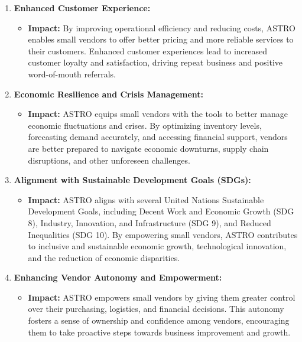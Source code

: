 \begin{enumerate}
	\item \textbf{Enhanced Customer Experience:}
	      \begin{itemize}
		      \item \textbf{Impact:} By improving operational efficiency and reducing costs, ASTRO enables small vendors to offer better pricing and more reliable services to their customers. Enhanced customer experiences lead to increased customer loyalty and satisfaction, driving repeat business and positive word-of-mouth referrals.
	      \end{itemize}

	\item \textbf{Economic Resilience and Crisis Management:}
	      \begin{itemize}
		      \item \textbf{Impact:} ASTRO equips small vendors with the tools to better manage economic fluctuations and crises. By optimizing inventory levels, forecasting demand accurately, and accessing financial support, vendors are better prepared to navigate economic downturns, supply chain disruptions, and other unforeseen challenges.
	      \end{itemize}

	\item \textbf{Alignment with Sustainable Development Goals (SDGs):}
	      \begin{itemize}
		      \item \textbf{Impact:} ASTRO aligns with several United Nations Sustainable Development Goals, including Decent Work and Economic Growth (SDG 8), Industry, Innovation, and Infrastructure (SDG 9), and Reduced Inequalities (SDG 10). By empowering small vendors, ASTRO contributes to inclusive and sustainable economic growth, technological innovation, and the reduction of economic disparities.
	      \end{itemize}

	\item \textbf{Enhancing Vendor Autonomy and Empowerment:}
	      \begin{itemize}
		      \item \textbf{Impact:} ASTRO empowers small vendors by giving them greater control over their purchasing, logistics, and financial decisions. This autonomy fosters a sense of ownership and confidence among vendors, encouraging them to take proactive steps towards business improvement and growth.
	      \end{itemize}
\end{enumerate}
